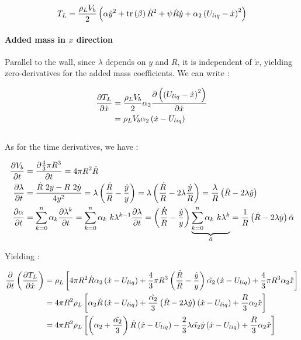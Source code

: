 \begin{align}
T_{L}=\frac{\rho_{L}V_{b}}{2}\left( \alpha \dot{y}^{2} +\mathrm{tr}\left( \beta \right)\dot{R}^{2}+\psi \dot{R}\dot{y} +\alpha_{2} \left( U_{liq}-\dot{x} \right)^{2}  \right)
\end{align}
 

\paragraph{Added mass in $x$ direction}

Parallel to the wall, since $\lambda$ depends on $y$ and $R$, it is independent of $\dot{x}$, yielding zero-derivatives for the added mass coefficients. We can write :

\begin{align}
\frac{\partial T_{L}}{\partial \dot{x}}&=\frac{\rho_{L}V_{b}}{2}\alpha_{2} \frac{\partial \left(  \left( U_{liq}-\dot{x} \right)^{2} \right) }{\partial \dot{x}}\\
&= \rho_{L}V_{b}\alpha_{2}\left( \dot{x}-U_{liq} \right)\\
\end{align}\\

As for the time derivatives, we have : 

\begin{align}
\frac{\partial V_{b}}{\partial t}&=\frac{\partial \frac{4}{3}\pi R^{3}}{\partial t} = 4\pi R^{2} \dot{R}\\
\frac{\partial \lambda}{\partial t}&=\frac{\dot{R}~2y-R~2\dot{y}}{4y^{2}}=\lambda\left(  \frac{\dot{R}}{R} - \frac{\dot{y}}{y}   \right)=\lambda \left( \frac{\dot{R}}{R}-2\lambda \frac{\dot{y}}{R} \right)=\frac{\lambda}{R}\left( \dot{R}-2\lambda \dot{y} \right)\\
\frac{\partial \alpha}{\partial t}&=\sum_{k=0}^{n}\alpha_{k}\frac{\partial \lambda ^{k}}{\partial t} = \sum_{k=0}^{n}\alpha_{k}~k\lambda ^{k-1} \frac{\partial \lambda}{\partial t} = \left(  \frac{\dot{R}}{R} - \frac{\dot{y}}{y}   \right)\underbrace{ \sum_{k=0}^{n}\alpha_{k}~k\lambda^{k} }_{\tilde{\alpha}} = \frac{1}{R}\left( \dot{R}-2\lambda \dot{y} \right)\tilde{\alpha}
\end{align}

Yielding : 

\begin{align}
\frac{\partial }{\partial t}\left(  \frac{\partial T_{L}}{\partial \dot{x}} \right)&=\rho_{L}\left[  4\pi R^{2} \dot{R} \alpha_{2}\left( \dot{x}-U_{liq} \right)+\frac{4}{3}\pi R^{3}\left(  \frac{\dot{R}}{R} - \frac{\dot{y}}{y}  \right)\tilde{\alpha_{2}}\left( \dot{x}-U_{liq} \right)+\frac{4}{3}\pi R^{3}\alpha_{2} \ddot{x}  \right] \\
&=4\pi R^{2} \rho_{L}\left[  \alpha_{2}\dot{R}\left( \dot{x}-U_{liq} \right)+\frac{\tilde{\alpha_{2}}}{3}\left( \dot{R}- 2\lambda \dot{y}  \right)\left( \dot{x}-U_{liq} \right) + \frac{R}{3}\alpha_{2}\ddot{x}  \right]\\
&=4 \pi R^{2} \rho_{L}\left[ \left( \alpha_{2}+\frac{\tilde{\alpha_{2}}}{3} \right)\dot{R}\left( \dot{x}-U_{liq} \right)-\frac{2}{3}\lambda \tilde{\alpha_{2}}\dot{y}\left( \dot{x}-U_{liq} \right)+\frac{R}{3}\alpha_{2}\ddot{x}  \right]
\end{align}

